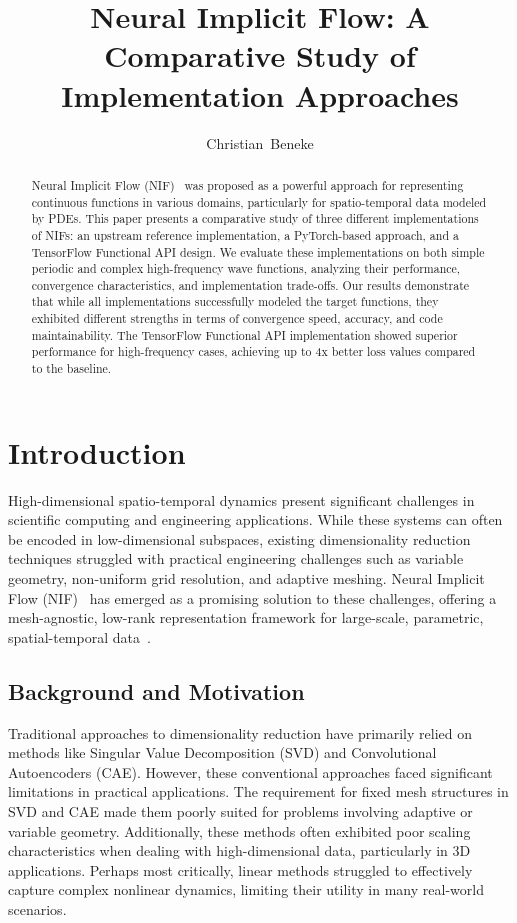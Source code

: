 \documentclass[10pt,journal,compsoc,onecolumn]{IEEEtran}
\begin{document}
\title{Neural Implicit Flow: A Comparative Study of Implementation Approaches}

\author{Christian~Beneke}

\maketitle

\begin{abstract}
Neural Implicit Flow (NIF)~\cite{nif2023} was proposed as a powerful approach for representing continuous functions in various domains, particularly for spatio-temporal data modeled by PDEs. This paper presents a comparative study of three different implementations of NIFs: an upstream reference implementation, a PyTorch-based approach, and a TensorFlow Functional API design. We evaluate these implementations on both simple periodic and complex high-frequency wave functions, analyzing their performance, convergence characteristics, and implementation trade-offs. Our results demonstrate that while all implementations successfully modeled the target functions, they exhibited different strengths in terms of convergence speed, accuracy, and code maintainability. The TensorFlow Functional API implementation showed superior performance for high-frequency cases, achieving up to 4x better loss values compared to the baseline.
\end{abstract}

\section{Introduction}
High-dimensional spatio-temporal dynamics present significant challenges in scientific computing and engineering applications. While these systems can often be encoded in low-dimensional subspaces, existing dimensionality reduction techniques struggled with practical engineering challenges such as variable geometry, non-uniform grid resolution, and adaptive meshing. Neural Implicit Flow (NIF)~\cite{nif2023} has emerged as a promising solution to these challenges, offering a mesh-agnostic, low-rank representation framework for large-scale, parametric, spatial-temporal data~\cite{neural_fields2022}.

\subsection{Background and Motivation}
Traditional approaches to dimensionality reduction have primarily relied on methods like Singular Value Decomposition (SVD) and Convolutional Autoencoders (CAE). However, these conventional approaches faced significant limitations in practical applications. The requirement for fixed mesh structures in SVD and CAE made them poorly suited for problems involving adaptive or variable geometry. Additionally, these methods often exhibited poor scaling characteristics when dealing with high-dimensional data, particularly in 3D applications. Perhaps most critically, linear methods struggled to effectively capture complex nonlinear dynamics, limiting their utility in many real-world scenarios.
\end{document}

